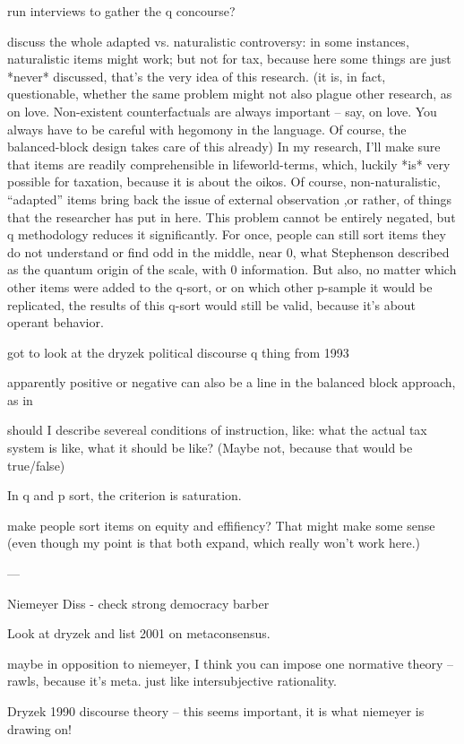 run interviews to gather the q concourse?

discuss the whole adapted vs. naturalistic controversy: in some instances, naturalistic items might work; but not for tax, because here some things are just *never* discussed, that's the very idea of this research.
(it is, in fact, questionable, whether the same problem might not also plague other research, as on love. Non-existent counterfactuals are always important – say, on love. You always have to be careful with hegomony in the language. Of course, the balanced-block design takes care of this already)
In my research, I'll make sure that items are readily comprehensible in lifeworld-terms, which, luckily *is* very possible for taxation, because it is about the oikos.
Of course, non-naturalistic, ``adapted'' items bring back the issue of external observation ,or rather, of things that the researcher has put in here. This problem cannot be entirely negated, but q methodology reduces it significantly.
For once, people can still sort items they do not understand or find odd in the middle, near 0, what Stephenson described as the quantum origin of the scale, with 0 information.
But also, no matter which other items were added to the q-sort, or on which other p-sample it would be replicated, the results of this q-sort would still be valid, because it's about operant behavior.

got to look at the dryzek political discourse q thing from 1993

apparently positive or negative can also be a line in the balanced block approach, as in \citep[23]{McKeown2013}

should I describe severeal conditions of instruction, like: what the actual tax system is like, what it should be like? (Maybe not, because that would be true/false)

In q and p sort, the criterion is saturation.

make people sort items on equity and effifiency? That might make some sense (even though my point is that both expand, which really won't work here.)

---

Niemeyer Diss
- check strong democracy barber

Look at dryzek and list 2001 on metaconsensus.

maybe in opposition to niemeyer, I think you can impose one normative theory – rawls, because it's meta.
just like intersubjective rationality.

Dryzek 1990 discourse theory – this seems important, it is what niemeyer is drawing on!

